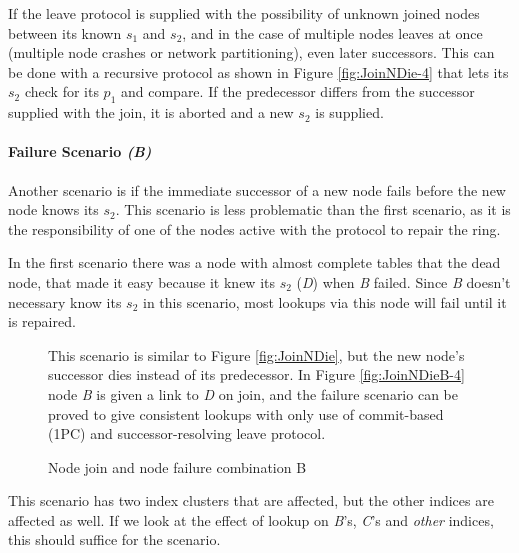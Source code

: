 If the leave protocol is supplied with the possibility of unknown joined nodes between its
 known $s_1$ and $s_2$, and in the case of multiple nodes leaves at once (multiple node
 crashes or network partitioning), even later successors. This can be done with a recursive
 protocol as shown in Figure \ref{fig:JoinNDie-4} that lets its $s_2$ check for its $p_1$
 and compare. If the predecessor differs from the successor supplied with the join, it is
 aborted and a new $s_2$ is supplied.

\paragraph{Failure Scenario \emph{(B)}}
Another scenario is if the immediate successor of a new node fails before the
 new node knows its $s_2$. This scenario is less problematic than
 the first scenario, as it is the responsibility of one of the nodes active with the
 protocol to repair the ring.

In the first scenario there was a node with almost complete tables that
  the dead node,
 that made it easy because it knew its $s_2$ (\emph{D}) when \emph{B} failed.
 Since \emph{B} doesn't necessary know its $s_2$ in this scenario, most lookups via this
 node will fail until it is repaired.

\begin{figure}[htp]
\centering
{}
\parbox{.9\linewidth}{ \small
  This scenario is similar to Figure \ref{fig:JoinNDie}, but the new node's successor
  dies instead of its predecessor. In Figure \ref{fig:JoinNDieB-4} node \emph{B} is
  given a link to \emph{D} on join, and the failure scenario can be proved to give
  consistent lookups with only use of commit-based (1PC) and successor-resolving leave
  protocol.
}
\caption{Node join and node failure combination B}
\label{fig:JoinNDieB}
\end{figure}

This scenario has two index clusters that are affected, but the other indices are
 affected as well. If we look at the effect of lookup on \emph{B}'s, \emph{C}'s and
 \emph{other} indices, this should suffice for the scenario.


